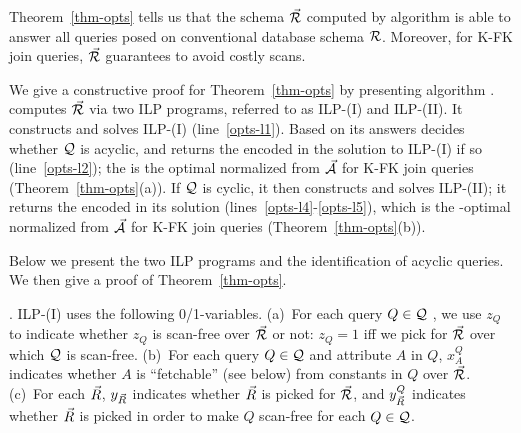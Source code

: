 \vspace{0.6ex}
Theorem~\ref{thm-opts} tells us that the \baav schema
$\vec{{\mathcal R}}$ computed by
algorithm \opts is able to answer all \SQL queries posed
on conventional database schema ${\mathcal R}$. Moreover, for 
K-FK join \SPC queries, $\vec{{\mathcal R}}$ guarantees to avoid
costly scans.

\vspace{0.6ex}
We give a constructive proof for Theorem~\ref{thm-opts}
by presenting algorithm \opts. \opts
computes $\vec{{\mathcal R}}$ via two ILP programs,
referred to as ILP-(I) and ILP-(II).
It constructs and solves ILP-(I) (line~\ref{opts-l1}).
Based on its answers \opts decides whether $\mathcal Q$ is acyclic,
and returns the \bds encoded in the solution to ILP-(I) if so
(line~\ref{opts-l2}); the \bds is the optimal normalized \bds from
$\vec{{\mathcal A}}$ for K-FK join \SPC queries
(Theorem~\ref{thm-opts}(a)). 
If $\mathcal Q$ is cyclic, it then constructs and
solves ILP-(II); it returns the \bds encoded in its solution
(lines~\ref{opts-l4}-\ref{opts-l5}), which
is the \ssf-optimal
normalized \bds from $\vec{{\mathcal A}}$ for K-FK join \SPC queries
(Theorem~\ref{thm-opts}(b)).


\vspace{0.8ex}
Below we present the two ILP programs and the identification
of acyclic queries. We then give a proof
of Theorem~\ref{thm-opts}.


. 
ILP-(I) uses the following 0/1-variables. 
(a)~For each query $Q\in \mathcal Q$ , we use $z_{Q}$ to indicate whether
$z_{Q}$ is scan-free over $\vec{{\mathcal R}}$ or not:
$z_{Q} = 1$ iff we pick \bss for $\vec{{\mathcal R}}$ over which $\mathcal Q$ is scan-free.
(b)~For each query $Q\in \mathcal Q$ and attribute $A$ in $Q$, 
$x_{A}^{Q}$ indicates whether $A$ is ``fetchable'' (see below)
from constants
in $Q$ over $\vec{{\mathcal R}}$. 
(c)~For each \bs $\vec{R}$, $y_{\vec{R}}$ indicates
whether $\vec{R}$ is picked for $\vec{{\mathcal R}}$, and $y^{Q}_{\vec{R}}$ 
indicates whether $\vec{R}$ is picked in order to make $Q$ scan-free
for each $Q\in \mathcal Q$.

